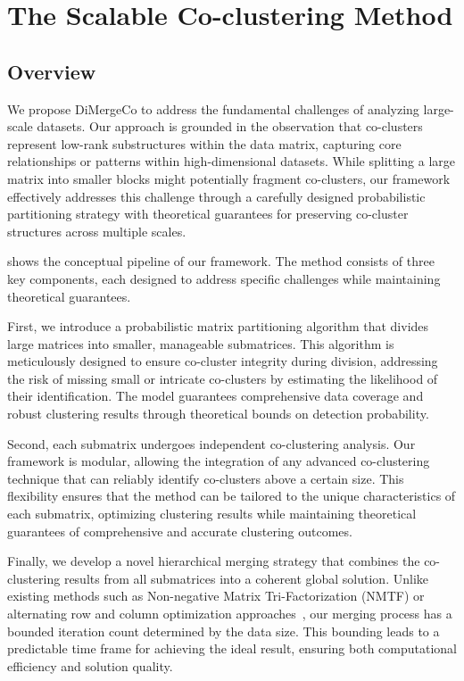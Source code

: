 \documentclass[journal]{IEEEtran}
\renewcommand{\cite}[1]{~\autocite{#1}}
\begin{document}
\section{The Scalable Co-clustering Method}
\label{sec:proposed-model}

\subsection{Overview}
\label{subsec:overview}
We propose DiMergeCo to address the fundamental challenges of analyzing large-scale datasets. Our approach is grounded in the observation that co-clusters represent low-rank substructures within the data matrix, capturing core relationships or patterns within high-dimensional datasets. While splitting a large matrix into smaller blocks might potentially fragment co-clusters, our framework effectively addresses this challenge through a carefully designed probabilistic partitioning strategy with theoretical guarantees for preserving co-cluster structures across multiple scales.

 shows the conceptual pipeline of our framework. The method consists of three key components, each designed to address specific challenges while maintaining theoretical guarantees.

First, we introduce a probabilistic matrix partitioning algorithm that divides large matrices into smaller, manageable submatrices. This algorithm is meticulously designed to ensure co-cluster integrity during division, addressing the risk of missing small or intricate co-clusters by estimating the likelihood of their identification. The model guarantees comprehensive data coverage and robust clustering results through theoretical bounds on detection probability.

Second, each submatrix undergoes independent co-clustering analysis. Our framework is modular, allowing the integration of any advanced co-clustering technique that can reliably identify co-clusters above a certain size. This flexibility ensures that the method can be tailored to the unique characteristics of each submatrix, optimizing clustering results while maintaining theoretical guarantees of comprehensive and accurate clustering outcomes.

Finally, we develop a novel hierarchical merging strategy that combines the co-clustering results from all submatrices into a coherent global solution. Unlike existing methods such as Non-negative Matrix Tri-Factorization (NMTF) or alternating row and column optimization approaches\cite{wang2011FastNonnegativeMatrix}, our merging process has a bounded iteration count determined by the data size. This bounding leads to a predictable time frame for achieving the ideal result, ensuring both computational efficiency and solution quality.
\end{document}
